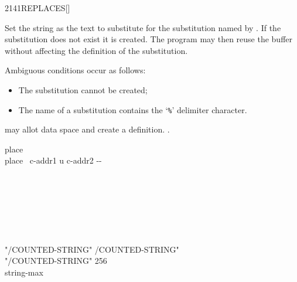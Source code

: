 \begin{worddef}{2141}{REPLACES}[]%
\item {}

	Set the string  as the text to substitute for
	the substitution named by .
	If the substitution does not exist it is created.
	The program may then reuse the buffer  without
	affecting the definition of the substitution.

	Ambiguous conditions occur as follows:
	\begin{itemize}
	\item The substitution cannot be created;
	\item The name of a substitution contains the `\texttt{\%}' delimiter character.
	\end{itemize}

	 may allot data space and create a definition. 
	.

  

	\begin{implement} %

		\word[tools]{[UNDEFINED]} place \word[tools]{[IF]} \\
		\tab \word{:} place \tab {} \ c-addr1 u c-addr2 -{}- \\
		\tab {}  \\
		\tab {}  \\
		\tab[2]   \\
		  \word{+}   \\
		\tab[2]   \\
		\tab \word{;} \\
		\word[tools]{[THEN]}

		\word{:} "/COUNTED-STRING"  /COUNTED-STRING" \word{;} \\
		"/COUNTED-STRING"   \word[tools]{[IF]} 256 \word[tools]{[THEN]} \\
		  string-max


\end{implement}
\end{worddef}

